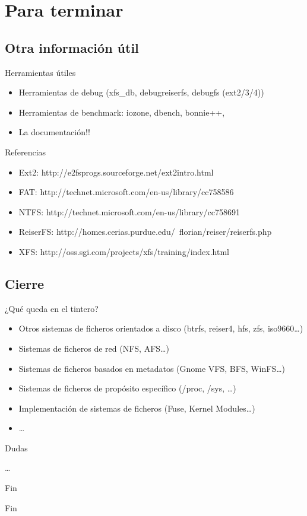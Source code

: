 \section*{Para terminar}
\subsection*{Otra información útil}
\begin{frame}{Herramientas útiles}
  \begin{itemize}
    \item Herramientas de debug (xfs\_db, debugreiserfs, debugfs (ext2/3/4))
    \item Herramientas de benchmark: iozone, dbench, bonnie++,
    \item La documentación!!
  \end{itemize}
\end{frame}

\begin{frame}{Referencias}
  \begin{itemize}
    \item Ext2: http://e2fsprogs.sourceforge.net/ext2intro.html
    \item FAT: http://technet.microsoft.com/en-us/library/cc758586%
    \item NTFS: http://technet.microsoft.com/en-us/library/cc758691%
    \item ReiserFS: http://homes.cerias.purdue.edu/~florian/reiser/reiserfs.php
    \item XFS: http://oss.sgi.com/projects/xfs/training/index.html
  \end{itemize}
\end{frame}

\subsection*{Cierre}

\begin{frame}{¿Qué queda en el tintero?}
  \begin{itemize}
    \item Otros sistemas de ficheros orientados a disco (btrfs, reiser4, hfs, zfs, iso9660\dots)
    \item Sistemas de ficheros de red (NFS, AFS\dots)
    \item Sistemas de ficheros basados en metadatos (Gnome VFS, BFS, WinFS\dots)
    \item Sistemas de ficheros de propósito específico (/proc, /sys, \dots)
    \item Implementación de sistemas de ficheros (Fuse, Kernel Modules\dots)
    \item \dots
  \end{itemize}
\end{frame}

\begin{frame}{Dudas}
  \begin{center}
    \dots
  \end{center}
\end{frame}

\begin{frame}{Fin}
  \begin{center}
    Fin
  \end{center}
\end{frame}
